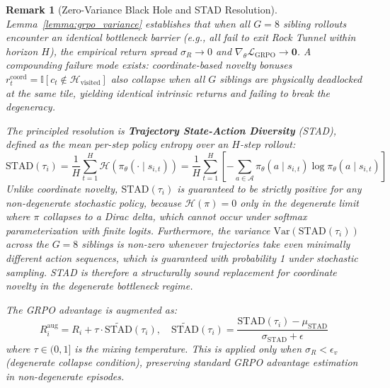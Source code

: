 \documentclass[journal,10pt,twocolumn]{IEEEtran}
\newtheorem{remark}{Remark}
\begin{document}
\begin{remark}[Zero-Variance Black Hole and STAD Resolution]
\label{rem:stad}
Lemma~\ref{lemma:grpo_variance} establishes that when all $G = 8$ sibling rollouts encounter an identical bottleneck barrier (e.g., all fail to exit Rock Tunnel within horizon $H$), the empirical return spread $\sigma_R \to 0$ and $\nabla_\theta \mathcal{L}_{\text{GRPO}} \to \mathbf{0}$. A compounding failure mode exists: coordinate-based novelty bonuses $r_t^{\text{coord}} = \mathbb{I}[c_t \notin \mathcal{H}_{\text{visited}}]$ also collapse when all $G$ siblings are physically deadlocked at the same tile, yielding identical intrinsic returns and failing to break the degeneracy.

The principled resolution is \textbf{Trajectory State-Action Diversity} (STAD), defined as the mean per-step policy entropy over an $H$-step rollout:
\begin{equation}
\label{eq:stad}
\text{STAD}(\tau_i) = \frac{1}{H} \sum_{t=1}^{H} \mathcal{H}\!\left(\pi_\theta(\cdot \mid s_{i,t})\right) = \frac{1}{H} \sum_{t=1}^{H} \left[ -\sum_{a \in \mathcal{A}} \pi_\theta(a \mid s_{i,t}) \log \pi_\theta(a \mid s_{i,t}) \right]
\end{equation}
Unlike coordinate novelty, $\text{STAD}(\tau_i)$ is \emph{guaranteed to be strictly positive} for any non-degenerate stochastic policy, because $\mathcal{H}(\pi) = 0$ only in the degenerate limit where $\pi$ collapses to a Dirac delta, which cannot occur under softmax parameterization with finite logits. Furthermore, the variance $\text{Var}(\text{STAD}(\tau_i))$ across the $G = 8$ siblings is non-zero whenever trajectories take even minimally different action sequences, which is guaranteed with probability 1 under stochastic sampling. STAD is therefore a structurally sound replacement for coordinate novelty in the degenerate bottleneck regime.

The GRPO advantage is augmented as:
\begin{equation}
R_i^{\text{aug}} = R_i + \tau \cdot \widetilde{\text{STAD}}(\tau_i), \quad \widetilde{\text{STAD}}(\tau_i) = \frac{\text{STAD}(\tau_i) - \mu_{\text{STAD}}}{\sigma_{\text{STAD}} + \epsilon}
\end{equation}
where $\tau \in (0, 1]$ is the mixing temperature. This is applied \emph{only} when $\sigma_R < \epsilon_v$ (degenerate collapse condition), preserving standard GRPO advantage estimation in non-degenerate episodes.
\end{remark}
\end{document}
